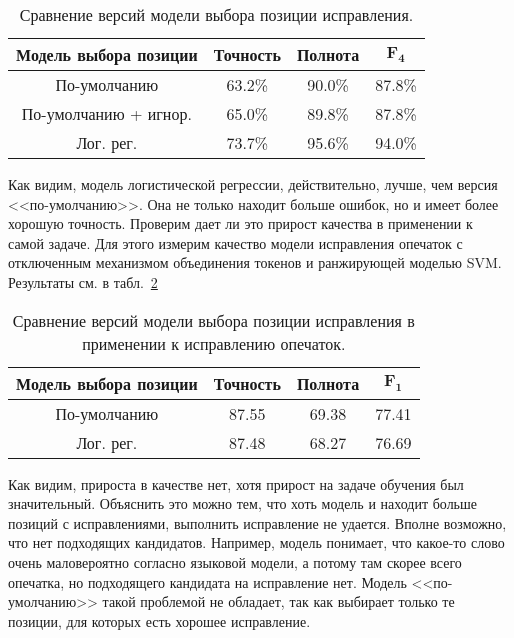 \begin{table}[h]
	\begin{center}
		\caption{Сравнение версий модели выбора позиции исправления.}
		\label{table:position_selector_comparison}
		\begin{tabular}{|c|c|c|c|}
			\hline
			\textbf{Модель выбора позиции} & \textbf{Точность} & \textbf{Полнота} & $\boldsymbol{F_4}$  \\
			\hline
			По-умолчанию & 63.2\% & 90.0\%  & 87.8\% \\
			По-умолчанию + игнор. & 65.0\% & 89.8\%  & 87.8\% \\
			Лог. рег. & 73.7\% & 95.6\% & 94.0\%  \\
			\hline
		\end{tabular}
	\end{center}
\end{table}

Как видим, модель логистической регрессии, действительно, лучше, чем версия <<по-умолчанию>>. Она не только находит больше ошибок, но и имеет более хорошую точность. Проверим дает ли это прирост качества в применении к самой задаче. Для этого измерим качество модели исправления опечаток с отключенным механизмом объединения токенов и ранжирующей моделью SVM. Результаты см. в табл.~\ref{table:position_selector_extrinsic_comparison}

\begin{table}[h]
	\begin{center}
		\caption{Сравнение версий модели выбора позиции исправления в применении к исправлению опечаток.}
		\label{table:position_selector_extrinsic_comparison}
		\begin{tabular}{|c|c|c|c|}
			\hline
			\textbf{Модель выбора позиции} & \textbf{Точность}  & \textbf{Полнота} & $\boldsymbol{F_1}$  \\
			\hline
			По-умолчанию & 87.55 & 69.38 & 77.41 \\
			Лог. рег. & 87.48  & 68.27 & 76.69  \\
			\hline
		\end{tabular}
	\end{center}
\end{table}

Как видим, прироста в качестве нет, хотя прирост на задаче обучения был значительный. Объяснить это можно тем, что хоть модель и находит больше позиций с исправлениями, выполнить исправление не удается. Вполне возможно, что нет подходящих кандидатов. Например, модель понимает, что какое-то слово очень маловероятно согласно языковой модели, а потому там скорее всего опечатка, но подходящего кандидата на исправление нет. Модель <<по-умолчанию>> такой проблемой не обладает, так как выбирает только те позиции, для которых есть хорошее исправление.

